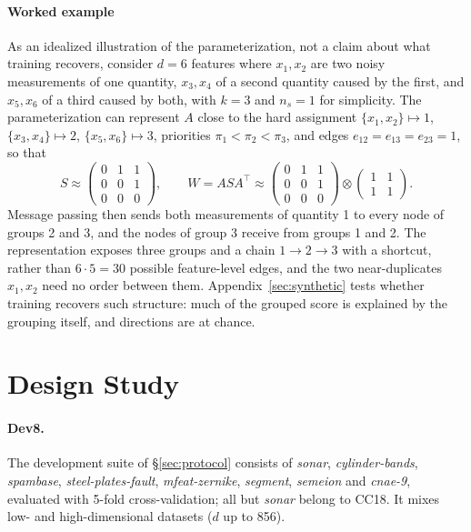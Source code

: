 \documentclass[anon,12pt]{clear2027} %
\newcommand{\T}{^{\top}}
\begin{document}
\paragraph{Worked example}
\label{sec:example}
As an idealized illustration of the parameterization, not a claim about what training recovers, consider $d=6$ features where $x_1,x_2$ are two noisy measurements of one quantity, $x_3,x_4$ of a second quantity caused by the first, and $x_5,x_6$ of a third caused by both, with $k=3$ and $n_s=1$ for simplicity. The parameterization can represent $A$ close to the hard assignment $\{x_1,x_2\}\mapsto 1$, $\{x_3,x_4\}\mapsto 2$, $\{x_5,x_6\}\mapsto 3$, priorities $\pi_1<\pi_2<\pi_3$, and edges $e_{12}=e_{13}=e_{23}=1$, so that
\[
S\approx\begin{pmatrix}0&1&1\\0&0&1\\0&0&0\end{pmatrix},\qquad
W=ASA\T\approx\begin{pmatrix}0&1&1\\0&0&1\\0&0&0\end{pmatrix}\otimes\begin{pmatrix}1&1\\1&1\end{pmatrix}.
\]
Message passing then sends both measurements of quantity 1 to every node of groups 2 and 3, and the nodes of group 3 receive from groups 1 and 2. The representation exposes three groups and a chain $1\to2\to3$ with a shortcut, rather than $6\cdot5=30$ possible feature-level edges, and the two near-duplicates $x_1,x_2$ need no order between them. Appendix~\ref{sec:synthetic} tests whether training recovers such structure: much of the grouped score is explained by the grouping itself, and directions are at chance.


\section{Design Study}
\label{app:design}
\label{sec:design}

\paragraph{Dev8.} The development suite of \S\ref{sec:protocol} consists of \emph{sonar}, \emph{cylinder-bands}, \emph{spambase}, \emph{steel-plates-fault}, \emph{mfeat-zernike}, \emph{segment}, \emph{semeion} and \emph{cnae-9}, evaluated with 5-fold cross-validation; all but \emph{sonar} belong to CC18. It mixes low- and high-dimensional datasets ($d$ up to 856).
\end{document}
